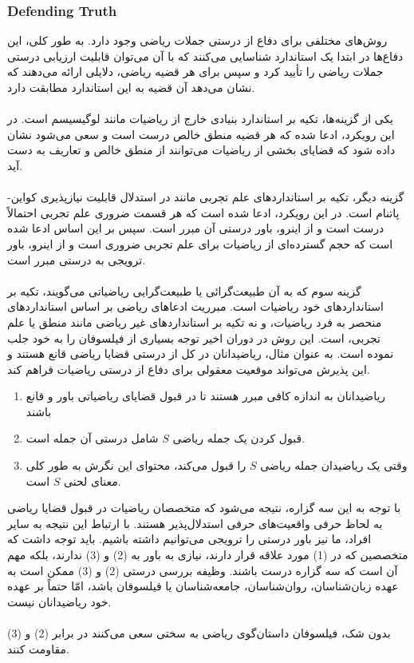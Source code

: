 \documentclass[10pt,a4paper]{article}
\begin{document}
                    \subsubsection{Defending Truth}
روش‌های مختلفی برای دفاع از درستی جملات ریاضی وجود دارد. به طور کلی، این دفاع‌ها در ابتدا یک استاندارد شناسایی می‌کنند که با آن می‌توان قابلیت ارزیابی درستی جملات ریاضی را تأیید کرد و سپس برای هر قضیه ریاضی، دلایلی ارائه می‌دهند که نشان می‌دهد آن قضیه به این استاندارد مطابقت دارد.
                        \\
                        \\
یکی از گزینه‌ها، تکیه بر استاندارد بنیادی خارج از ریاضیات مانند لوگیسیسم است. در این رویکرد، ادعا شده که هر قضیه منطق خالص درست است و سعی می‌شود نشان داده شود که قضایای بخشی از ریاضیات می‌توانند از منطق خالص و تعاریف به دست آید.
                        \\
                        \\
گزینه دیگر، تکیه بر استانداردهای علم تجربی مانند در استدلال قابلیت نیازپذیری کواین-پاتنام است. در این رویکرد، ادعا شده است که هر قسمت ضروری علم تجربی احتمالاً درست است و از اینرو، باور درستی آن مبرر است. سپس بر این اساس ادعا شده است که حجم گسترده‌ای از ریاضیات برای علم تجربی ضروری است و از اینرو، باور ترویجی به درستی مبرر است.
                        \\
                        \\
گزینه سوم که به آن طبیعت‌گرائی یا طبیعت‌گرایی ریاضیاتی می‌گویند، تکیه بر استانداردهای خود ریاضیات است. مبرریت ادعاهای ریاضی بر اساس استانداردهای منحصر به فرد ریاضیات، و نه تکیه بر استانداردهای غیر ریاضی مانند منطق یا علم تجربی، است. این روش در دوران اخیر توجه بسیاری از فیلسوفان را به خود جلب نموده است. به عنوان مثال، ریاضیدانان در کل از درستی قضایا ریاضی قانع هستند و این پذیرش می‌تواند موقعیت معقولی برای دفاع از درستی ریاضیات فراهم کند.
                        \begin{enumerate}
                            \item ریاضیدانان به اندازه کافی مبرر هستند تا در قبول قضایای ریاضیاتی باور و قانع باشند
                            \item قبول کردن یک جمله ریاضی $S$ شامل درستی آن جمله است.
                            \item وقتی یک ریاضیدان جمله ریاضی $S$ را قبول می‌کند، محتوای این نگرش به طور کلی معنای لحنی $S$ است.
                        \end{enumerate}
با توجه به این سه گزاره، نتیجه می‌شود که متخصصان ریاضیات در قبول قضایا ریاضی به لحاظ حرفی واقعیت‌های حرفی استدلال‌پذیر هستند. با ارتباط این نتیجه به سایر افراد، ما نیز باور درستی را ترویجی می‌توانیم داشته باشیم. باید توجه داشت که متخصصین که در (1) مورد علاقه قرار دارند، نیازی به باور به (2) و (3) ندارند، بلکه مهم آن است که سه گزاره درست باشند. وظیفه بررسی درستی (2) و (3) ممکن است به عهده زبان‌شناسان، روان‌شناسان، جامعه‌شناسان یا فیلسوفان باشد، امّا حتماً بر عهده خود ریاضیدانان نیست.
                        \\
                        \\
                     بدون شک، فیلسوفان داستان‌گوی ریاضی به سختی سعی می‌کنند در برابر (2) و (3) مقاومت کنند.\cite{sep-platonism-mathematics}
\end{document}

